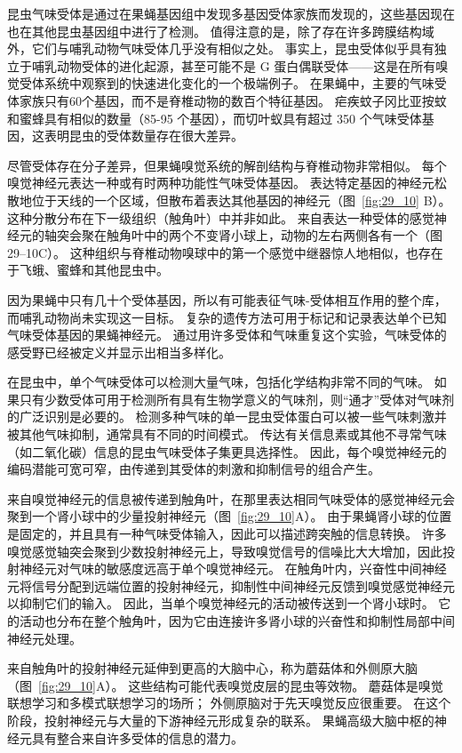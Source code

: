 昆虫气味受体是通过在果蝇基因组中发现多基因受体家族而发现的，这些基因现在也在其他昆虫基因组中进行了检测。
值得注意的是，除了存在许多跨膜结构域外，它们与哺乳动物气味受体几乎没有相似之处。
事实上，昆虫受体似乎具有独立于哺乳动物受体的进化起源，甚至可能不是 G 蛋白偶联受体——这是在所有嗅觉受体系统中观察到的快速进化变化的一个极端例子。
在果蝇中，主要的气味受体家族只有60个基因，而不是脊椎动物的数百个特征基因。
疟疾蚊子冈比亚按蚊和蜜蜂具有相似的数量（85-95 个基因），而切叶蚁具有超过 350 个气味受体基因，这表明昆虫的受体数量存在很大差异。


尽管受体存在分子差异，但果蝇嗅觉系统的解剖结构与脊椎动物非常相似。
每个嗅觉神经元表达一种或有时两种功能性气味受体基因。
表达特定基因的神经元松散地位于天线的一个区域，但散布着表达其他基因的神经元（图~\ref{fig:29_10} B）。
这种分散分布在下一级组织（触角叶）中并非如此。
来自表达一种受体的感觉神经元的轴突会聚在触角叶中的两个不变肾小球上，动物的左右两侧各有一个（图 29–10C）。
这种组织与脊椎动物嗅球中的第一个感觉中继器惊人地相似，也存在于飞蛾、蜜蜂和其他昆虫中。


因为果蝇中只有几十个受体基因，所以有可能表征气味-受体相互作用的整个库，而哺乳动物尚未实现这一目标。
复杂的遗传方法可用于标记和记录表达单个已知气味受体基因的果蝇神经元。
通过用许多受体和气味重复这个实验，气味受体的感受野已经被定义并显示出相当多样化。


在昆虫中，单个气味受体可以检测大量气味，包括化学结构非常不同的气味。
如果只有少数受体可用于检测所有具有生物学意义的气味剂，则“通才”受体对气味剂的广泛识别是必要的。
检测多种气味的单一昆虫受体蛋白可以被一些气味刺激并被其他气味抑制，通常具有不同的时间模式。
传达有关信息素或其他不寻常气味（如二氧化碳）信息的昆虫气味受体子集更具选择性。
因此，每个嗅觉神经元的编码潜能可宽可窄，由传递到其受体的刺激和抑制信号的组合产生。


来自嗅觉神经元的信息被传递到触角叶，在那里表达相同气味受体的感觉神经元会聚到一个肾小球中的少量投射神经元（图~\ref{fig:29_10}A）。
由于果蝇肾小球的位置是固定的，并且具有一种气味受体输入，因此可以描述跨突触的信息转换。
许多嗅觉感觉轴突会聚到少数投射神经元上，导致嗅觉信号的信噪比大大增加，因此投射神经元对气味的敏感度远高于单个嗅觉神经元。
在触角叶内，兴奋性中间神经元将信号分配到远端位置的投射神经元，抑制性中间神经元反馈到嗅觉感觉神经元以抑制它们的输入。
因此，当单个嗅觉神经元的活动被传送到一个肾小球时。 它的活动也分布在整个触角叶，因为它由连接许多肾小球的兴奋性和抑制性局部中间神经元处理。


来自触角叶的投射神经元延伸到更高的大脑中心，称为蘑菇体和外侧原大脑（图~\ref{fig:29_10}A）。
这些结构可能代表嗅觉皮层的昆虫等效物。 蘑菇体是嗅觉联想学习和多模式联想学习的场所；
外侧原脑对于先天嗅觉反应很重要。
在这个阶段，投射神经元与大量的下游神经元形成复杂的联系。
果蝇高级大脑中枢的神经元具有整合来自许多受体的信息的潜力。


